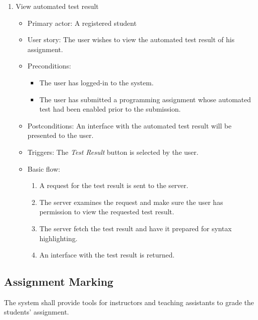\begin{enumerate}
\item View automated test result
\begin{itemize}
    \item Primary actor: A registered student
    \item User story: The user wishes to view the automated test result of his
        assignment.
    \item Preconditions:
        \begin{itemize}
            \item The user has logged-in to the system.
            \item The user has submitted a programming assignment whose
                automated test had been enabled prior to the submission.
        \end{itemize}
    \item Postconditions:
        An interface with the automated test result will be presented to the
        user.
    \item Triggers: 
        The \emph{Test Result} button is selected by the user.
    \item Basic flow:
        \begin{enumerate}
            \item A request for the test result is sent to the server.
            \item The server examines the request and make sure the user has
                permission to view the requested test result.
            \item The server fetch the test result and have it prepared for
                syntax highlighting.
            \item An interface with the test result is returned.
        \end{enumerate}
\end{itemize}
\end{enumerate}

\subsection{Assignment Marking}
The system shall provide tools for instructors and teaching assistants to grade
the students' assignment.

